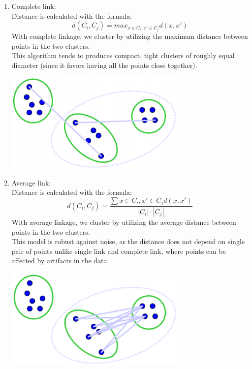 \documentclass{article}
\begin{document}
\begin{enumerate}
	\item Complete link:\\
	Distance is calculated with the formula:
	\begin{equation}
	    d(C_i,C_j) = max_{x \in C_i,x' \in C_j}d(x,x')
    \end{equation}
    With complete linkage, we cluster by utilizing the maximum distance between points in the two clusters.\\
    This algorithm tends to produces compact, tight clusters of roughly equal diameter (since it favors having all the points close together).
    \begin{center}
        \includegraphics[width=0.70\textwidth]{complete.png}
    \end{center}

	\item Average link:\\
	Distance is calculated with the formula:
	\begin{equation}
	    d(C_i,C_j) = \frac{\sum x \in C_i,x' \in C_j d(x,x')}{|C_i|\cdot |C_j|}
    \end{equation}
    With average linkage, we cluster by utilizing the average distance between points in the two clusters.\\
    This model is robust against noise, as the distance does not depend on single pair of points unlike single link and complete link, where points can be affected by artifacts in the data.
    \begin{center}
        \includegraphics[width=0.70\textwidth]{average.png}
    \end{center}
\end{enumerate}
\end{document}
